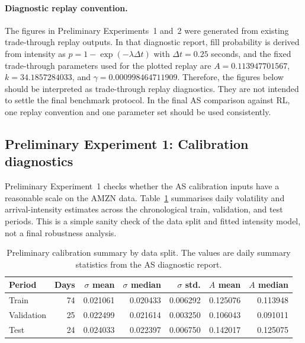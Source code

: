 \documentclass[oneside]{uva-inf-bachelor-thesis}
\begin{document}
\paragraph{Diagnostic replay convention.}
The figures in Preliminary Experiments~1 and~2 were generated from existing trade-through replay outputs. In that diagnostic report, fill probability is derived from intensity as $p = 1-\exp(-\lambda\Delta t)$ with $\Delta t=0.25$ seconds, and the fixed trade-through parameters used for the plotted replay are $A=0.113947701567$, $k=34.1857284033$, and $\gamma=0.000998464711909$. Therefore, the figures below should be interpreted as trade-through replay diagnostics. They are not intended to settle the final benchmark protocol. In the final AS comparison against RL, one replay convention and one parameter set should be used consistently.

\subsection{Preliminary Experiment 1: Calibration diagnostics}
\label{subsec:as-exp1}

Preliminary Experiment~1 checks whether the AS calibration inputs have a reasonable scale on the AMZN data. Table~\ref{tab:as-calibration-period-summary} summarises daily volatility and arrival-intensity estimates across the chronological train, validation, and test periods. This is a simple sanity check of the data split and fitted intensity model, not a final robustness analysis.

\begin{table}[htbp]
    \centering
    \caption{Preliminary calibration summary by data split. The values are daily summary statistics from the AS diagnostic report.}
    \label{tab:as-calibration-period-summary}
    \small
    \begin{tabular}{lrrrrrr}
        \toprule
        Period & Days & $\sigma$ mean & $\sigma$ median & $\sigma$ std. & $A$ mean & $A$ median \\
        \midrule
        Train & 74 & 0.021061 & 0.020433 & 0.006292 & 0.125076 & 0.113948 \\
        Validation & 25 & 0.022499 & 0.021614 & 0.003250 & 0.106043 & 0.091011 \\
        Test & 24 & 0.024033 & 0.022397 & 0.006750 & 0.142017 & 0.125075 \\
        \bottomrule
    \end{tabular}
\end{table}
\end{document}

